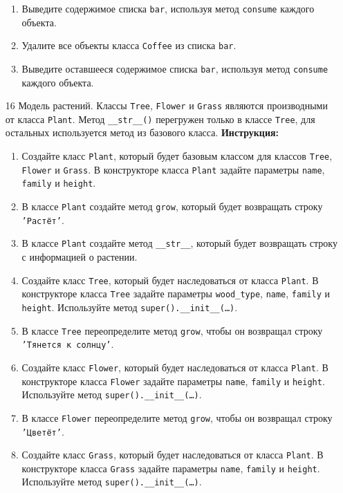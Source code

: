\begin{enumerate}
\begin{enumerate}
    \item Выведите содержимое списка \texttt{bar}, используя метод \texttt{consume} каждого объекта.
    \item Удалите все объекты класса \texttt{Coffee} из списка \texttt{bar}.
    \item Выведите оставшееся содержимое списка \texttt{bar}, используя метод \texttt{consume} каждого объекта.
\end{enumerate}
\item[16]
Модель растений. Классы \texttt{Tree}, \texttt{Flower} и \texttt{Grass} являются производными от класса \texttt{Plant}. Метод \texttt{\_\_str\_\_()} перегружен только в классе \texttt{Tree}, для остальных используется метод из базового класса.
\textbf{Инструкция:}
\begin{enumerate}
    \item Создайте класс \texttt{Plant}, который будет базовым классом для классов \texttt{Tree}, \texttt{Flower} и \texttt{Grass}. В конструкторе класса \texttt{Plant} задайте параметры \texttt{name}, \texttt{family} и \texttt{height}.
    \item В классе \texttt{Plant} создайте метод \texttt{grow}, который будет возвращать строку \texttt{'Растёт'}.
    \item В классе \texttt{Plant} создайте метод \texttt{\_\_str\_\_}, который будет возвращать строку с информацией о растении.
    \item Создайте класс \texttt{Tree}, который будет наследоваться от класса \texttt{Plant}. В конструкторе класса \texttt{Tree} задайте параметры \texttt{wood\_type}, \texttt{name}, \texttt{family} и \texttt{height}. Используйте метод \texttt{super().\_\_init\_\_(\ldots)}.
    \item В классе \texttt{Tree} переопределите метод \texttt{grow}, чтобы он возвращал строку \texttt{'Тянется к солнцу'}.
    \item Создайте класс \texttt{Flower}, который будет наследоваться от класса \texttt{Plant}. В конструкторе класса \texttt{Flower} задайте параметры \texttt{name}, \texttt{family} и \texttt{height}. Используйте метод \texttt{super().\_\_init\_\_(\ldots)}.
    \item В классе \texttt{Flower} переопределите метод \texttt{grow}, чтобы он возвращал строку \texttt{'Цветёт'}.
    \item Создайте класс \texttt{Grass}, который будет наследоваться от класса \texttt{Plant}. В конструкторе класса \texttt{Grass} задайте параметры \texttt{name}, \texttt{family} и \texttt{height}. Используйте метод \texttt{super().\_\_init\_\_(\ldots)}.

\end{enumerate}
\end{enumerate}
